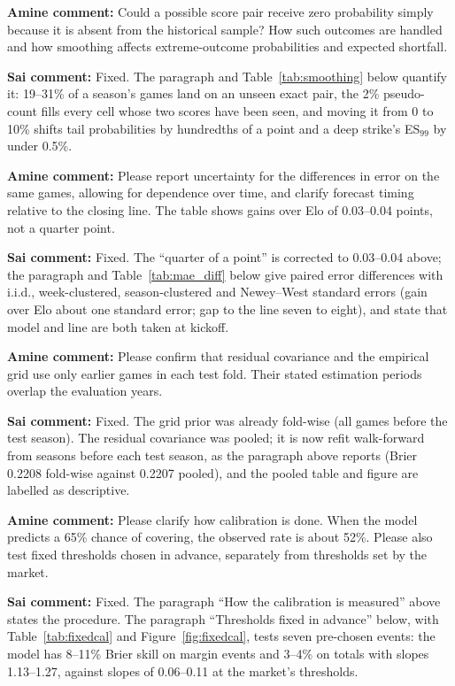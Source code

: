 {\color{red}\textbf{Amine comment:} Could a possible score pair receive zero probability simply because it is absent from the historical sample? How such outcomes are handled and how smoothing affects extreme-outcome probabilities and expected shortfall.}

{\color{blue}\textbf{Sai comment:} Fixed. The paragraph and Table~\ref{tab:smoothing} below quantify it: 19--31\% of a season's games land on an unseen exact pair, the 2\% pseudo-count fills every cell whose two scores have been seen, and moving it from 0 to 10\% shifts tail probabilities by hundredths of a point and a deep strike's ES$_{99}$ by under 0.5\%.}

{\color{red}\textbf{Amine comment:} Please report uncertainty for the differences in error on the same games, allowing for dependence over time, and clarify forecast timing relative to the closing line. The table shows gains over Elo of 0.03--0.04 points, not a quarter point.}

{\color{blue}\textbf{Sai comment:} Fixed. The ``quarter of a point'' is corrected to 0.03--0.04 above; the paragraph and Table~\ref{tab:mae_diff} below give paired error differences with i.i.d., week-clustered, season-clustered and Newey--West standard errors (gain over Elo about one standard error; gap to the line seven to eight), and state that model and line are both taken at kickoff.}

{\color{red}\textbf{Amine comment:} Please confirm that residual covariance and the empirical grid use only earlier games in each test fold. Their stated estimation periods overlap the evaluation years.}

{\color{blue}\textbf{Sai comment:} Fixed. The grid prior was already fold-wise (all games before the test season). The residual covariance was pooled; it is now refit walk-forward from seasons before each test season, as the paragraph above reports (Brier 0.2208 fold-wise against 0.2207 pooled), and the pooled table and figure are labelled as descriptive.}

{\color{red}\textbf{Amine comment:} Please clarify how calibration is done. When the model predicts a 65\% chance of covering, the observed rate is about 52\%. Please also test fixed thresholds chosen in advance, separately from thresholds set by the market.}

{\color{blue}\textbf{Sai comment:} Fixed. The paragraph ``How the calibration is measured'' above states the procedure. The paragraph ``Thresholds fixed in advance'' below, with Table~\ref{tab:fixedcal} and Figure~\ref{fig:fixedcal}, tests seven pre-chosen events: the model has 8--11\% Brier skill on margin events and 3--4\% on totals with slopes 1.13--1.27, against slopes of 0.06--0.11 at the market's thresholds.}

